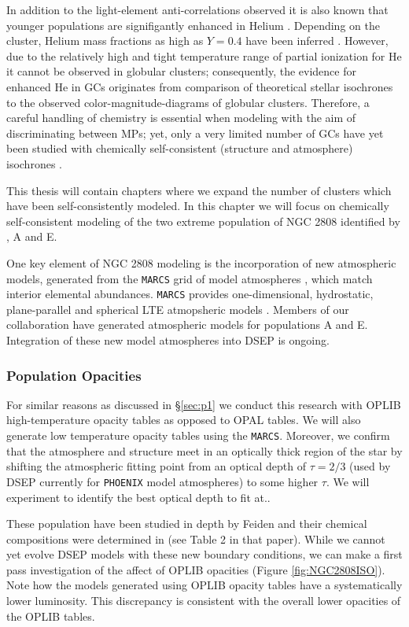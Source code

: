 In addition to the light-element anti-correlations observed it is also known
that younger populations are signifigantly enhanced in Helium
\citep{Piotto2007, Piotto2015, Latour2019}. Depending on the cluster, Helium
mass fractions as high as $Y=0.4$ have been inferred \citep[e.g][]{Milone2015}.
However, due to the relatively high and tight temperature range of partial
ionization for He it cannot be observed in globular clusters; consequently, the
evidence for enhanced He in GCs originates from comparison of theoretical
stellar isochrones to the observed color-magnitude-diagrams of globular
clusters. Therefore, a careful handling of chemistry is essential when modeling
with the aim of discriminating between MPs; yet, only a very limited number of
GCs have yet been studied with chemically self-consistent (structure and
atmosphere) isochrones \citep[e.g.][NGC 6752]{Dotter2015}.

This thesis will contain chapters where we expand the number of clusters which
have been self-consistently modeled. In this chapter we will focus on
chemically self-consistent modeling of the two extreme population of NGC 2808
identified by \citep{Milone2015}, A and E.

One key element of NGC 2808 modeling is the incorporation of new atmospheric
models, generated from the \texttt{MARCS} grid of model atmospheres \citep{Plez2008},
which match interior elemental abundances. \texttt{MARCS} provides one-dimensional,
hydrostatic, plane-parallel and spherical LTE atmopsheric models
\citep{Gustafsson2008}. Members of our collaboration have generated atmospheric 
models for populations A and E.  Integration of these new model atmospheres
into DSEP is ongoing. 

\subsubsection{Population Opacities}
For similar reasons as discussed in \S\ref{sec:p1} we conduct this research
with OPLIB high-temperature opacity tables as opposed to OPAL tables. We will
also generate low temperature opacity tables using the \texttt{MARCS}.
Moreover, we confirm that the atmosphere and structure meet in an optically
thick region of the star by shifting the atmospheric fitting point from an optical
depth of $\tau = 2/3$ (used by DSEP currently for \texttt{PHOENIX} model atmospheres) to
some higher $\tau$. We will experiment to identify the best optical depth to
fit at.. 

These population have been studied in depth by Feiden and their chemical
compositions were determined in \citet{Milone2015} (see Table 2 in that paper).
While we cannot yet evolve DSEP models with these new boundary conditions, we
can make a first pass investigation of the affect of OPLIB opacities (Figure
\ref{fig:NGC2808ISO}). Note how the models generated using OPLIB opacity tables
have a systematically lower luminosity. This discrepancy is consistent with
the overall lower opacities of the OPLIB tables. 

